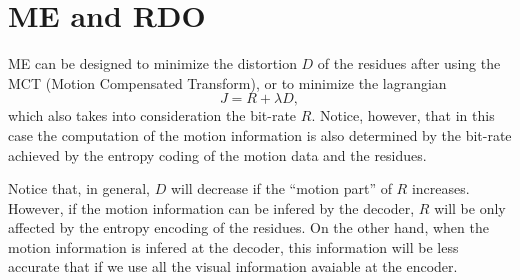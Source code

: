 \begin{comment}
\begin{figure}
  \centering
  \png{stockholm_hat_P_farneback}{800}
  \caption{The prediction frame (${\hat{\mathbf P}}$). See \href{https://github.com/Sistemas-Multimedia/Sistemas-Multimedia.github.io/blob/master/milestones/09-ME/farneback_ME.ipynb}{this}.}
  \label{fig:hat_P_farneback}
\end{figure}

\begin{figure}
  \centering
  \png{stockholm_error_farneback}{800}
  \caption{The prediction error frame (${\mathbf R} - {\hat{\mathbf P}}$). See \href{https://github.com/Sistemas-Multimedia/Sistemas-Multimedia.github.io/blob/master/milestones/09-ME/farneback_ME.ipynb}{this}.}
  \label{fig:error_farneback}
\end{figure}

\begin{figure}
  \centering
  \png{stockholm_MVs_farneback}{800}
  \caption{Motion vectors to map ${\mathbf P}$ (from which each pixel has been mapped) onto ${\mathbf R}$. See \href{https://github.com/Sistemas-Multimedia/Sistemas-Multimedia.github.io/blob/master/milestones/09-ME/farneback_ME.ipynb}{this}.}
  \label{fig:MVs_farneback}
\end{figure}
\end{comment}



\section{ME and RDO}

ME can be designed to minimize the distortion $D$ of the residues
after using the MCT (Motion Compensated Transform), or to minimize the
lagrangian
\begin{equation}
  J = R + \lambda D,
\end{equation}
which also takes into consideration the bit-rate $R$. Notice, however,
that in this case the computation of the motion information is also
determined by the bit-rate achieved by the entropy coding of the
motion data and the residues.

Notice that, in general, $D$ will decrease if the ``motion part'' of
$R$ increases. However, if the motion information can be infered by
the decoder, $R$ will be only affected by the entropy encoding of the
residues. On the other hand, when the motion information is infered at
the decoder, this information will be less accurate that if we use all
the visual information avaiable at the encoder.

